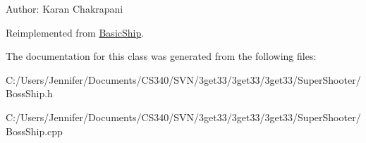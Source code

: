 Author: Karan Chakrapani 

Reimplemented from \hyperlink{class_basic_ship_a6d498fc95af4562fcec7273897f98067}{BasicShip}.

The documentation for this class was generated from the following files:\begin{DoxyCompactItemize}
\item 
C:/Users/Jennifer/Documents/CS340/SVN/3get33/3get33/3get33/SuperShooter/BossShip.h\item 
C:/Users/Jennifer/Documents/CS340/SVN/3get33/3get33/3get33/SuperShooter/BossShip.cpp\end{DoxyCompactItemize}

